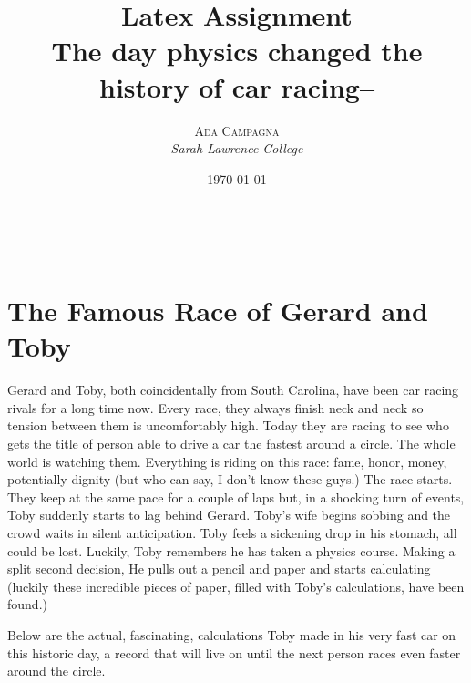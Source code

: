 \documentclass[a4paper, 11pt]{article} %
\title{\textbf{Latex Assignment}\\ %
The day physics changed the history of car racing-- } %
\author{\textsc{Ada Campagna} %
\\{\textit{Sarah Lawrence College}}} %
\date{\today} %
\makeatletter
\renewcommand{\maketitle}{ %
\begin{flushright} %
{\LARGE\@title} %

\vspace{50pt} %

{\large\@author} %
\\\@date %

\vspace{40pt} %
\end{flushright}
}
\makeatother
\begin{document}
\maketitle %





\vspace{30pt} %


\section*{The Famous Race of Gerard and Toby}

Gerard and Toby, both coincidentally from South Carolina, have been car racing rivals for a long time now. Every race, they always finish neck and neck so tension between them is uncomfortably high. Today they are racing to see who gets the title of person able to drive a car the fastest around a circle. The whole world is watching them. Everything is riding on this race: fame, honor, money, potentially dignity (but who can say, I don't know these guys.) The race starts. They keep at the same pace for a couple of laps but, in a shocking turn of events, Toby suddenly starts  to lag behind Gerard. Toby's wife begins sobbing and  the crowd waits in silent anticipation. Toby feels a sickening drop in his stomach, all could be lost. Luckily, Toby remembers he has taken a physics course. Making a split second decision,  He pulls out a pencil and paper and starts calculating (luckily these incredible pieces of paper, filled with Toby's calculations, have been found.) 


Below are the actual, fascinating, calculations Toby made in his very fast car on this historic day, a record that will live on until the next person races even faster around the circle. 

\end{document}
